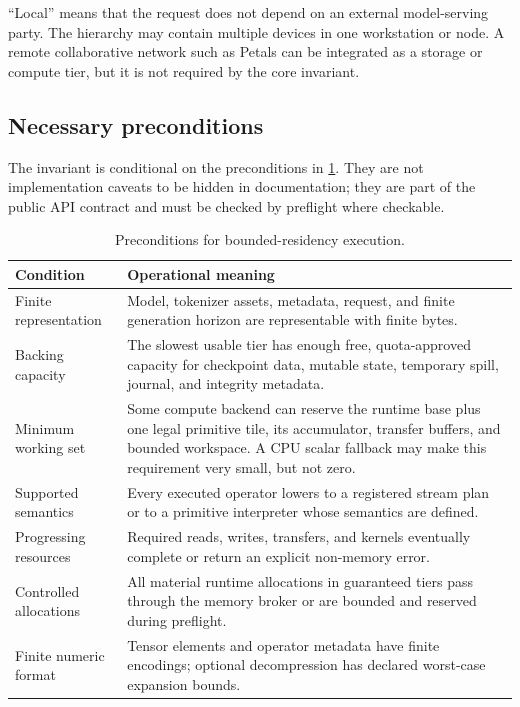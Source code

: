 ``Local'' means that the request does not depend on an external model-serving party. The hierarchy may contain multiple devices in one workstation or node. A remote collaborative network such as Petals \cite{borzunov2022petals} can be integrated as a storage or compute tier, but it is not required by the core invariant.

\subsection{Necessary preconditions}

The invariant is conditional on the preconditions in \cref{tab:preconditions}. They are not implementation caveats to be hidden in documentation; they are part of the public API contract and must be checked by preflight where checkable.

\begin{table}[t]
\centering
\caption{Preconditions for bounded-residency execution.}
\label{tab:preconditions}
\begin{tabularx}{\textwidth}{@{}p{}X@{}}
\toprule
Condition & Operational meaning \\
\midrule
Finite representation & Model, tokenizer assets, metadata, request, and finite generation horizon are representable with finite bytes. \\
Backing capacity & The slowest usable tier has enough free, quota-approved capacity for checkpoint data, mutable state, temporary spill, journal, and integrity metadata. \\
Minimum working set & Some compute backend can reserve the runtime base plus one legal primitive tile, its accumulator, transfer buffers, and bounded workspace. A CPU scalar fallback may make this requirement very small, but not zero. \\
Supported semantics & Every executed operator lowers to a registered stream plan or to a primitive interpreter whose semantics are defined. \\
Progressing resources & Required reads, writes, transfers, and kernels eventually complete or return an explicit non-memory error. \\
Controlled allocations & All material runtime allocations in guaranteed tiers pass through the memory broker or are bounded and reserved during preflight. \\
Finite numeric format & Tensor elements and operator metadata have finite encodings; optional decompression has declared worst-case expansion bounds. \\
\bottomrule
\end{tabularx}
\end{table}

